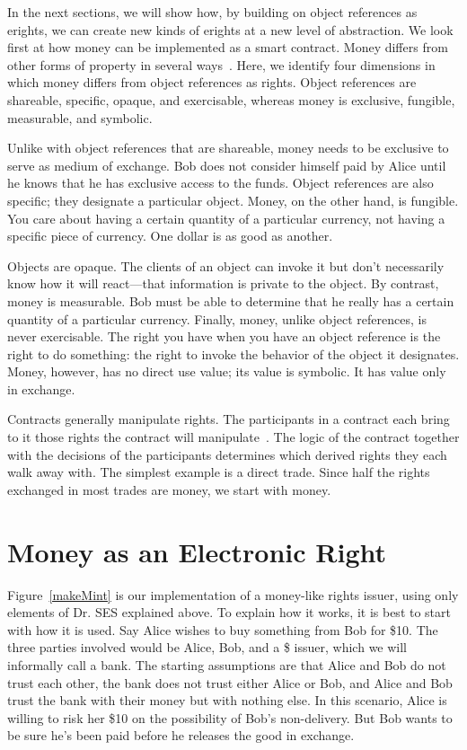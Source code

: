 \documentclass{llncs}
\begin{document}
In the next sections, we will show how, by building on object references as erights, we can create new kinds of erights at a new level of abstraction. We look first at how money can be implemented as a smart contract. Money differs from other forms of property in several ways~\cite{fox_property_2008}.  Here, we identify four dimensions in which money differs from object references as rights. Object references are shareable, specific, opaque, and exercisable, whereas money is exclusive, fungible, measurable, and symbolic.

Unlike with object references that are shareable, money needs to be exclusive to serve as medium of exchange. Bob does not consider himself paid by Alice until he knows that he has exclusive access to the funds. Object references are also specific; they designate a particular object. Money, on the other hand, is fungible. You care about having a certain quantity of a particular currency, not having a specific piece of currency. One dollar is as good as another. 

Objects are opaque. The clients of an object can invoke it but don't necessarily know how it will react---that information is private to the object. By contrast, money is measurable. Bob must be able to determine that he really has a certain quantity of a particular currency. Finally, money, unlike object references, is never exercisable. The right you have when you have an object reference is the right to do something: the right to invoke the behavior of the object it designates. Money, however, has no direct use value; its value is symbolic. It has value only in exchange.


Contracts generally manipulate rights. The participants in a contract each bring to it those rights the contract will manipulate~\cite{barnett_consent_1986}. The logic of the contract together with the decisions of the participants determines which derived rights they each walk away with. The simplest example is a direct trade. Since half the rights exchanged in most trades are money, we start with money.


\section{Money as an Electronic Right}
\label{money}

Figure~\ref{makeMint}  is our implementation of a money-like rights issuer, using only elements of Dr. SES explained above. To explain how it works, it is best to start with how it is used. Say Alice wishes to buy something from Bob for \$10. The three parties involved would be Alice, Bob, and a \$ issuer, which we will informally call a bank. The starting assumptions are that Alice and Bob do not trust each other, the bank does not trust either Alice or Bob, and Alice and Bob trust the bank with their money but with nothing else. In this scenario, Alice is willing to risk her \$10 on the possibility of Bob's non-delivery. But Bob wants to be sure he's been paid before he releases the good in exchange.
\end{document}
